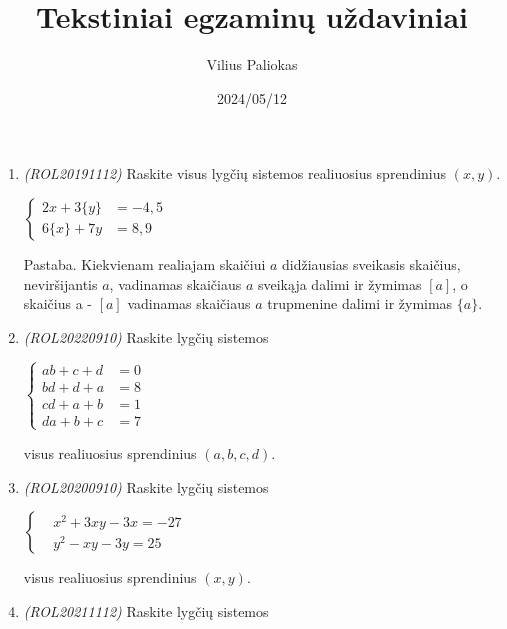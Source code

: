 \documentclass[a4paper]{article}
\title{Tekstiniai egzaminų uždaviniai}
\author{Vilius Paliokas}
\date{2024/05/12}
\begin{document}
\thispagestyle{fancy}

\titlespacing*{\subsection}{0pt}{.75ex}{0.75ex}

\begin{enumerate}
      \item \textit{(ROL20191112)} Raskite visus lygčių sistemos
            realiuosius sprendinius $(x,y)$.

            $\left\{\begin{aligned}
                        2x+3\{y\} & = -4,5 \\
                        6\{x\}+7y & = 8,9
                  \end{aligned}\right.$

            Pastaba. Kiekvienam realiajam skaičiui $a$ didžiausias sveikasis skaičius,
            neviršijantis $a$, vadinamas skaičiaus $a$ sveikąja dalimi ir žymimas $[a]$, o
            skaičius a - $[a]$ vadinamas skaičiaus $a$ trupmenine dalimi ir žymimas
            $\{a\}$.

      \item \textit{(ROL20220910)} Raskite lygčių sistemos

            $\left\{\begin{aligned}
                        ab+c+d & = 0 \\
                        bd+d+a & = 8 \\
                        cd+a+b & =1  \\
                        da+b+c & =7
                  \end{aligned}\right.$

            visus realiuosius sprendinius $(a,b,c,d)$.

      \item \textit{(ROL20200910)} Raskite lygčių sistemos

            $\left\{\begin{aligned}
                         & x^2+3xy-3x = -27 \\
                         & y^2-xy-3y = 25
                  \end{aligned}\right.$

            visus realiuosius sprendinius $(x, y)$.

      \item \textit{(ROL20211112)} Raskite lygčių sistemos


\end{enumerate}
\end{document}
